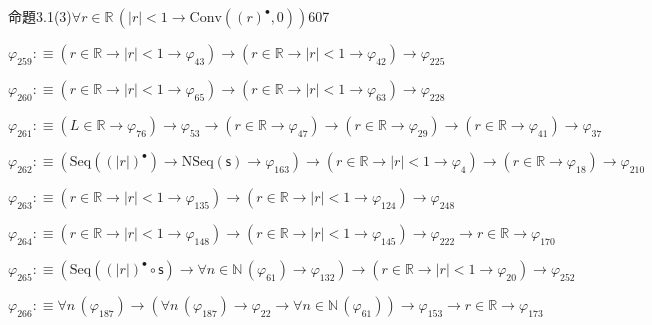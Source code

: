 \begin{fullproof}{命題3.1(3)}{$\forall r \in \mathbb{R}\,(\lvert r \rvert < 1 \to \mathrm{Conv}({(r)^{\bullet}},0))$}{607}
\begin{abbrevlist}
\item $\varphi_{259} :\equiv (r \in \mathbb{R} \to \lvert r \rvert < 1 \to \varphi_{43}) \to (r \in \mathbb{R} \to \lvert r \rvert < 1 \to \varphi_{42}) \to \varphi_{225}$
\item $\varphi_{260} :\equiv (r \in \mathbb{R} \to \lvert r \rvert < 1 \to \varphi_{65}) \to (r \in \mathbb{R} \to \lvert r \rvert < 1 \to \varphi_{63}) \to \varphi_{228}$
\item $\varphi_{261} :\equiv (L \in \mathbb{R} \to \varphi_{76}) \to \varphi_{53} \to (r \in \mathbb{R} \to \varphi_{47}) \to (r \in \mathbb{R} \to \varphi_{29}) \to (r \in \mathbb{R} \to \varphi_{41}) \to \varphi_{37}$
\item $\varphi_{262} :\equiv (\mathrm{Seq}({(\lvert r \rvert)^{\bullet}}) \to \mathrm{NSeq}(\mathsf{s}) \to \varphi_{163}) \to (r \in \mathbb{R} \to \lvert r \rvert < 1 \to \varphi_{4}) \to (r \in \mathbb{R} \to \varphi_{18}) \to \varphi_{210}$
\item $\varphi_{263} :\equiv (r \in \mathbb{R} \to \lvert r \rvert < 1 \to \varphi_{135}) \to (r \in \mathbb{R} \to \lvert r \rvert < 1 \to \varphi_{124}) \to \varphi_{248}$
\item $\varphi_{264} :\equiv (r \in \mathbb{R} \to \lvert r \rvert < 1 \to \varphi_{148}) \to (r \in \mathbb{R} \to \lvert r \rvert < 1 \to \varphi_{145}) \to \varphi_{222} \to r \in \mathbb{R} \to \varphi_{170}$
\item $\varphi_{265} :\equiv (\mathrm{Seq}({(\lvert r \rvert)^{\bullet}} \circ \mathsf{s}) \to \forall n \in \mathbb{N}\,(\varphi_{61}) \to \varphi_{132}) \to (r \in \mathbb{R} \to \lvert r \rvert < 1 \to \varphi_{20}) \to \varphi_{252}$
\item $\varphi_{266} :\equiv \forall n\,(\varphi_{187}) \to (\forall n\,(\varphi_{187}) \to \varphi_{22} \to \forall n \in \mathbb{N}\,(\varphi_{61})) \to \varphi_{153} \to r \in \mathbb{R} \to \varphi_{173}$
\end{abbrevlist}
\end{fullproof}
